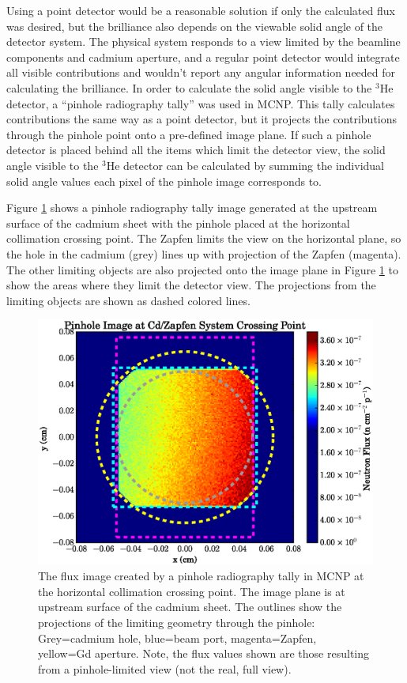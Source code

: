 \documentclass[5p,12pt]{elsarticle}
\begin{document}
Using a point detector would be a reasonable solution if only the calculated flux was desired, but the brilliance also depends on the viewable solid angle of the detector system.   The physical system responds to a view limited by the beamline components and cadmium aperture, and a regular point detector would integrate all visible contributions and wouldn't report any angular information needed for calculating the brilliance.  In order to calculate the solid angle visible to the $^3$He detector, a ``pinhole radiography tally'' was used in MCNP.  This tally calculates contributions the same way as a point detector, but it projects the contributions through the pinhole point onto a pre-defined image plane.  If such a pinhole detector is placed behind all the items which limit the detector view, the solid angle visible to the $^3$He detector can be calculated by summing the individual solid angle values each pixel of the pinhole image corresponds to.

Figure \ref{fig:pinhole_image} shows a pinhole radiography tally image generated at the upstream surface of the cadmium sheet with the pinhole placed at the horizontal collimation crossing point.  The Zapfen limits the view on the horizontal plane, so the hole in the cadmium (grey) lines up with projection of the Zapfen (magenta).  The other limiting objects are also projected onto the image plane in Figure \ref{fig:pinhole_image} to show the areas where they limit the detector view. The projections from the limiting objects are shown as dashed colored lines.   

\begin{figure}[h!] 
  \centering
    \includegraphics[width=\columnwidth]{graphics/pinhole.eps}
     \caption{The flux image created by a pinhole radiography tally in MCNP at the horizontal collimation crossing point.  The image plane is at upstream surface of the cadmium sheet.  The outlines show the projections of the limiting geometry through the pinhole: Grey=cadmium hole, blue=beam port, magenta=Zapfen, yellow=Gd aperture.  Note, the flux values shown are those resulting from a pinhole-limited view (not the real, full view).  \label{fig:pinhole_image}}
\end{figure}
\end{document}
